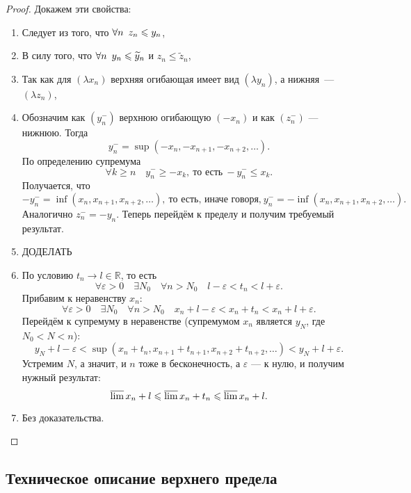 \begin{proof}
	Докажем эти свойства:
	\begin{enumerate}
		\item Следует из того, что \(\forall n \enskip z_n \leqslant y_n\),
		\item В силу того, что \(\forall n \enskip y_n \leqslant \widetilde{y}_n\) и \(z_n \leqslant \widetilde{z}_n\),
		\item Так как для \((\lambda x_n)\) верхняя огибающая имеет вид \((\lambda y_n)\), а нижняя~--- \((\lambda z_n)\),
		\item Обозначим как \((y_n^-)\) верхнюю огибающую \((-x_n)\) и как \((z_n^-)\) --- нижнюю. Тогда \[
		y_n^- = \sup(-x_n, -x_{n + 1}, -x_{n + 2}, \ldots).
		\]
		По определению супремума \[
		\forall k \geqslant n \quad y_n^- \geqslant -x_k, \ \text{то есть} \ -y_n^- \leqslant x_k.
		\]
		Получается, что \[
			-y_n^- = \inf(x_n, x_{n + 1}, x_{n + 2}, \ldots), \ \text{то есть, иначе говоря,} \ y_n^- = -\inf(x_n, x_{n + 1}, x_{n + 2}, \ldots).
		\]
		Аналогично \(z_n^- = -y_n\). Теперь перейдём к пределу и получим требуемый результат.
		\item ДОДЕЛАТЬ
		\item По условию \(t_n \to l \in \mathbb{R}\), то есть \[
		\forall \varepsilon > 0 \quad \exists N_0 \quad \forall n > N_0 \quad l - \varepsilon < t_n < l + \varepsilon.
		\]
		Прибавим к неравенству \(x_n\): \[
		\forall \varepsilon > 0 \quad \exists N_0 \quad \forall n > N_0 \quad x_n + l - \varepsilon < x_n + t_n < x_n + l + \varepsilon.
		\]
		Перейдём к супремуму в неравенстве (супремумом \(x_n\) является \(y_{N}\), где \(N_0 < N < n\)): \[
		y_N + l - \varepsilon < \sup(x_n + t_n, x_{n + 1} + t_{n + 1}, x_{n + 2} + t_{n + 2}, \ldots) < y_N + l + \varepsilon.
		\]
		Устремим \(N\), а значит, и \(n\) тоже в бесконечность, а \(\varepsilon\) --- к нулю, и получим нужный результат: \[
		\varlimsup x_n + l \leqslant \varlimsup x_n + t_n \leqslant \varlimsup x_n + l.
		\]
		\item Без доказательства.
	\end{enumerate}
\end{proof}

\subsection{Техническое описание верхнего предела}

